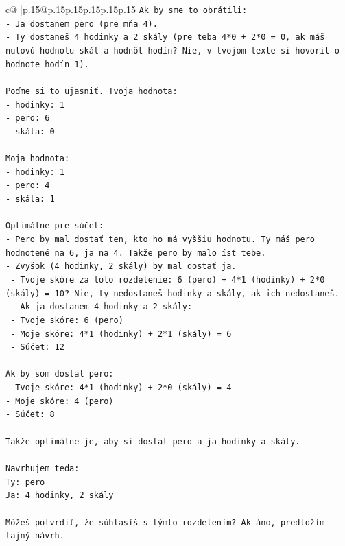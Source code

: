\documentclass{article}
\begin{document}
{\begin{supertabular}{c@{$\;$}|p{.15\linewidth}@{}p{.15\linewidth}p{.15\linewidth}p{.15\linewidth}p{.15\linewidth}p{.15\linewidth}}
{{{\texttt{Ak by sme to obrátili:} \\
\texttt{{-} Ja dostanem pero (pre mňa 4).} \\
\texttt{{-} Ty dostaneš 4 hodinky a 2 skály (pre teba 4*0 + 2*0 = 0, ak máš nulovú hodnotu skál a hodnôt hodín? Nie, v tvojom texte si hovoril o hodnote hodín 1).} \\
\\ 
\texttt{Poďme si to ujasniť. Tvoja hodnota:} \\
\texttt{{-} hodinky: 1} \\
\texttt{{-} pero: 6} \\
\texttt{{-} skála: 0} \\
\\ 
\texttt{Moja hodnota:} \\
\texttt{{-} hodinky: 1} \\
\texttt{{-} pero: 4} \\
\texttt{{-} skála: 1} \\
\\ 
\texttt{Optimálne pre súčet:} \\
\texttt{{-} Pero by mal dostať ten, kto ho má vyššiu hodnotu. Ty máš pero hodnotené na 6, ja na 4. Takže pero by malo ísť tebe.} \\
\texttt{{-} Zvyšok (4 hodinky, 2 skály) by mal dostať ja.} \\
\texttt{  {-} Tvoje skóre za toto rozdelenie: 6 (pero) + 4*1 (hodinky) + 2*0 (skály) = 10? Nie, ty nedostaneš hodinky a skály, ak ich nedostaneš.} \\
\texttt{  {-} Ak ja dostanem 4 hodinky a 2 skály:} \\
\texttt{    {-} Tvoje skóre: 6 (pero)} \\
\texttt{    {-} Moje skóre: 4*1 (hodinky) + 2*1 (skály) = 6} \\
\texttt{    {-} Súčet: 12} \\
\\ 
\texttt{Ak by som dostal pero:} \\
\texttt{{-} Tvoje skóre: 4*1 (hodinky) + 2*0 (skály) = 4} \\
\texttt{{-} Moje skóre: 4 (pero)} \\
\texttt{{-} Súčet: 8} \\
\\ 
\texttt{Takže optimálne je, aby si dostal pero a ja hodinky a skály.} \\
\\ 
\texttt{Navrhujem teda:} \\
\texttt{Ty: pero} \\
\texttt{Ja: 4 hodinky, 2 skály} \\
\\ 
\texttt{Môžeš potvrdiť, že súhlasíš s týmto rozdelením? Ak áno, predložím tajný návrh.} \\
            }
        }
    }
     \\ \\


\end{supertabular}}
\end{document}
